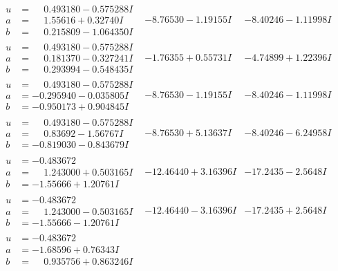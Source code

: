 \documentclass[1p]{elsarticle_modified}
\theoremstyle{definition}
\begin{document}
$$\begin{array}{c|c|c}
\begin{aligned}
u &= \phantom{-}0.493180 - 0.575288 I \\
a &= \phantom{-}1.55616 + 0.32740 I \\
b &= \phantom{-}0.215809 - 1.064350 I\end{aligned}
 & -8.76530 - 1.19155 I & -8.40246 - 1.11998 I \\ \hline\begin{aligned}
u &= \phantom{-}0.493180 - 0.575288 I \\
a &= \phantom{-}0.181370 - 0.327241 I \\
b &= \phantom{-}0.293994 - 0.548435 I\end{aligned}
 & -1.76355 + 0.55731 I & -4.74899 + 1.22396 I \\ \hline\begin{aligned}
u &= \phantom{-}0.493180 - 0.575288 I \\
a &= -0.295940 - 0.035805 I \\
b &= -0.950173 + 0.904845 I\end{aligned}
 & -8.76530 - 1.19155 I & -8.40246 - 1.11998 I \\ \hline\begin{aligned}
u &= \phantom{-}0.493180 - 0.575288 I \\
a &= \phantom{-}0.83692 - 1.56767 I \\
b &= -0.819030 - 0.843679 I\end{aligned}
 & -8.76530 + 5.13637 I & -8.40246 - 6.24958 I \\ \hline\begin{aligned}
u &= -0.483672\phantom{ +0.000000I} \\
a &= \phantom{-}1.243000 + 0.503165 I \\
b &= -1.55666 + 1.20761 I\end{aligned}
 & -12.46440 + 3.16396 I & -17.2435 - 2.5648 I \\ \hline\begin{aligned}
u &= -0.483672\phantom{ +0.000000I} \\
a &= \phantom{-}1.243000 - 0.503165 I \\
b &= -1.55666 - 1.20761 I\end{aligned}
 & -12.46440 - 3.16396 I & -17.2435 + 2.5648 I \\ \hline\begin{aligned}
u &= -0.483672\phantom{ +0.000000I} \\
a &= -1.68596 + 0.76343 I \\
b &= \phantom{-}0.935756 + 0.863246 I\end{aligned}

\end{array}$$
\end{document}
